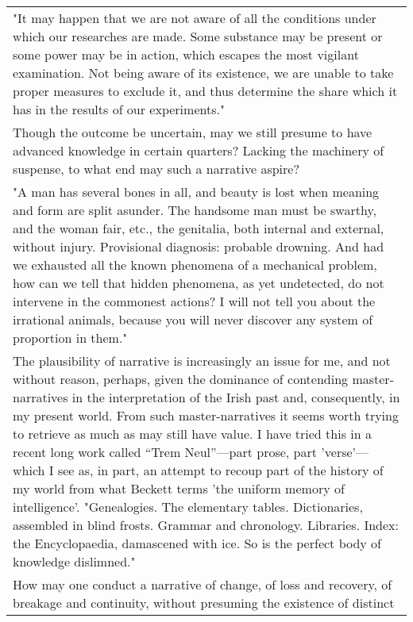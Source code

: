 \begin{longtable}[]{@{}l@{}}
\begin{minipage}[t]{0.97\columnwidth}
"It may happen that we are not aware of all the conditions under which
our researches are made. Some substance may be present or some power may
be in action, which escapes the most vigilant examination. Not being
aware of its existence, we are unable to take proper measures to exclude
it, and thus determine the share which it has in the results of our
experiments."\strut
\end{minipage}\tabularnewline
\begin{minipage}[t]{0.97\columnwidth}\raggedright
Though the outcome be uncertain, may we still presume to have advanced
knowledge in certain quarters? Lacking the machinery of suspense, to
what end may such a narrative aspire?\strut
\end{minipage}\tabularnewline
\begin{minipage}[t]{0.97\columnwidth}\raggedright
"A man has several bones in all, and beauty is lost when meaning and
form are split asunder. The handsome man must be swarthy, and the woman
fair, etc., the genitalia, both internal and external, without injury.
Provisional diagnosis: probable drowning. And had we exhausted all the
known phenomena of a mechanical problem, how can we tell that hidden
phenomena, as yet undetected, do not intervene in the commonest actions?
I will not tell you about the irrational animals, because you will never
discover any system of proportion in them."\strut
\end{minipage}\tabularnewline
\begin{minipage}[t]{0.97\columnwidth}\raggedright
The plausibility of narrative is increasingly an issue for me, and not
without reason, perhaps, given the dominance of contending
master-narratives in the interpretation of the Irish past and,
consequently, in my present world. From such master-narratives it seems
worth trying to retrieve as much as may still have value. I have tried
this in a recent long work called ``Trem Neul''---part prose, part
'verse'---which I see as, in part, an attempt to recoup part of the
history of my world from what Beckett terms 'the uniform memory of
intelligence'. "Genealogies. The elementary tables. Dictionaries,
assembled in blind frosts. Grammar and chronology. Libraries. Index: the
Encyclopaedia, damascened with ice. So is the perfect body of knowledge
dislimned."\strut
\end{minipage}\tabularnewline
\begin{minipage}[t]{0.97\columnwidth}\raggedright
How may one conduct a narrative of change, of loss and recovery, of
breakage and continuity, without presuming the existence of distinct

\end{minipage}
\end{longtable}
